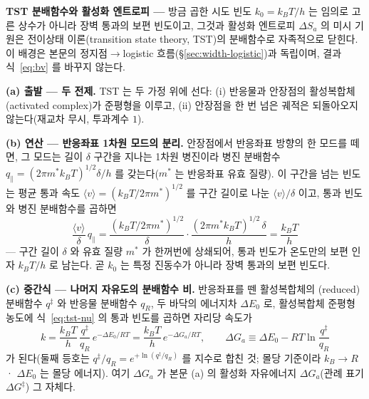 \begin{bgbox}
\textbf{TST 분배함수와 활성화 엔트로피 ---} 방금 곱한 시도 빈도 $k_0=k_BT/h$ 는 임의로 고른 상수가 아니라
장벽 통과의 보편 빈도이고, 그것과 활성화 엔트로피 $\Delta S_a$ 의 미시 기원은 전이상태 이론(transition state
theory, TST)의 분배함수로 자족적으로 닫힌다\cite{eyring1935,glasstone1941,laidlerking1983}. 이 배경은 본문의
정지점$\to$logistic 흐름(\S\ref{sec:width-logistic})과 독립이며, 결과식~\eqref{eq:bv} 를 바꾸지 않는다.

\textbf{(a) 출발 --- 두 전제.} TST 는 두 가정 위에 선다: (i) 반응물과 안장점의 활성복합체(activated complex)가
준평형을 이루고, (ii) 안장점을 한 번 넘은 궤적은 되돌아오지 않는다(재교차 무시, 투과계수 $1$).

\textbf{(b) 연산 --- 반응좌표 1차원 모드의 분리.} 안장점에서 반응좌표 방향의 한 모드를 떼면, 그 모드는 길이
$\delta$ 구간을 지나는 1차원 병진이라 병진 분배함수 $q_\parallel=(2\pi m^\ast k_BT)^{1/2}\delta/h$ 를 갖는다($m^\ast$
는 반응좌표 유효 질량). 이 구간을 넘는 빈도는 평균 통과 속도 $\langle v\rangle=(k_BT/2\pi m^\ast)^{1/2}$ 를 구간
길이로 나눈 $\langle v\rangle/\delta$ 이고, 통과 빈도와 병진 분배함수를 곱하면
\begin{equation}
\frac{\langle v\rangle}{\delta}\,q_\parallel
=\frac{(k_BT/2\pi m^\ast)^{1/2}}{\delta}\cdot\frac{(2\pi m^\ast k_BT)^{1/2}\,\delta}{h}
=\frac{k_BT}{h}
\label{eq:tst-nu}
\end{equation}
--- 구간 길이 $\delta$ 와 유효 질량 $m^\ast$ 가 한꺼번에 상쇄되어, 통과 빈도가 온도만의 보편 인자 $k_BT/h$ 로
남는다. 곧 $k_0$ 는 특정 진동수가 아니라 장벽 통과의 보편 빈도다.

\textbf{(c) 중간식 --- 나머지 자유도의 분배함수 비.} 반응좌표를 뗀 활성복합체의 (reduced) 분배함수 $q^\ddagger$
와 반응물 분배함수 $q_R$, 두 바닥의 에너지차 $\Delta E_0$ 로, 활성복합체 준평형 농도에 식~\eqref{eq:tst-nu} 의
통과 빈도를 곱하면 자리당 속도가\cite{mcquarrie1976}
\begin{equation}
k=\frac{k_BT}{h}\,\frac{q^\ddagger}{q_R}\,e^{-\Delta E_0/RT}
=\frac{k_BT}{h}\,e^{-\Delta G_a/RT},
\qquad
\Delta G_a\equiv\Delta E_0-RT\ln\!\frac{q^\ddagger}{q_R}
\label{eq:tst-rate}
\end{equation}
가 된다(둘째 등호는 $q^\ddagger/q_R=e^{+\ln(q^\ddagger/q_R)}$ 를 지수로 합친 것; 몰당 기준이라 $k_B\!\to\!R$·
$\Delta E_0$ 는 몰당 에너지). 여기 $\Delta G_a$ 가 본문 (a) 의 활성화 자유에너지 $\Delta G_a$(관례 표기
$\Delta G^\ddagger$) 그 자체다.


\end{bgbox}
